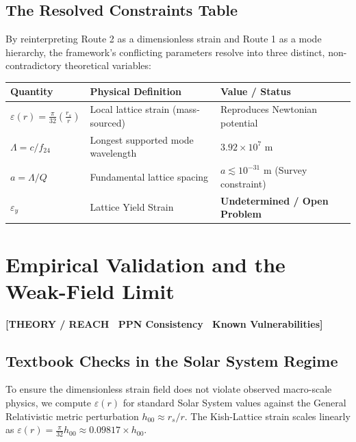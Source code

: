 \documentclass[11pt, letterpaper, openany]{book}
\begin{document}
\section{The Resolved Constraints Table}

By reinterpreting Route 2 as a dimensionless strain and Route 1 as a mode hierarchy, the framework's conflicting parameters resolve into three distinct, non-contradictory theoretical variables:

\vspace{0.3cm}
\begin{center}
\renewcommand{\arraystretch}{1.5}
\begin{tabular}{|l|l|l|}
\hline
\rowcolor{kishblue!12}
\textbf{Quantity} & \textbf{Physical Definition} & \textbf{Value / Status} \\
\hline
$\varepsilon(r) = \frac{\pi}{32} \left(\frac{r_s}{r}\right)$ & Local lattice strain (mass-sourced) & Reproduces Newtonian potential \\
\hline
$\Lambda = c/f_{24}$ & Longest supported mode wavelength & $3.92 \times 10^7$ m \\
\hline
$a = \Lambda/Q$ & Fundamental lattice spacing & $a \lesssim 10^{-31}$ m (Survey constraint) \\
\hline
$\varepsilon_y$ & Lattice Yield Strain & \textbf{Undetermined / Open Problem} \\
\hline
\end{tabular}
\end{center}
\vspace{0.3cm}

\chapter{Empirical Validation and the Weak-Field Limit}

\begin{center}
{\color{theorytag}\textbf{[THEORY / REACH \textbullet\ PPN Consistency \textbullet\ Known Vulnerabilities]}}
\end{center}

\section{Textbook Checks in the Solar System Regime}

To ensure the dimensionless strain field does not violate observed macro-scale physics, we compute $\varepsilon(r)$ for standard Solar System values against the General Relativistic metric perturbation $h_{00} \approx r_s/r$. The Kish-Lattice strain scales linearly as $\varepsilon(r) = \frac{\pi}{32} h_{00} \approx 0.09817 \times h_{00}$.
\end{document}
